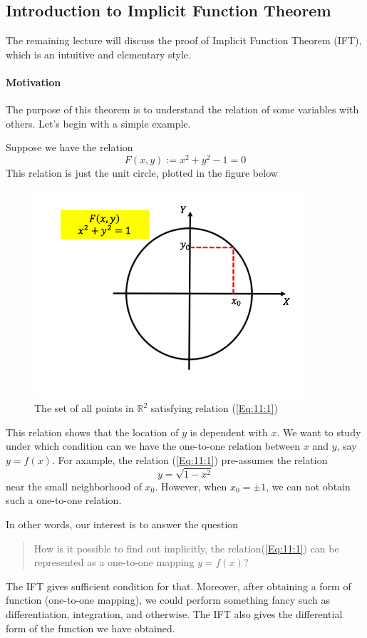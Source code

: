 \subsection{Introduction to Implicit Function Theorem}
The remaining lecture will discuss the proof of Implicit Function Theorem (IFT), which is an intuitive and elementary style.

\paragraph{Motivation}
The purpose of this theorem is to understand the relation of some variables with others. Let's begin with a simple example. 
\begin{example}
Suppose we have the relation
\begin{equation}\label{Eq:11:1}
F(x,y):=x^2+y^2-1=0
\end{equation}
This relation is just the unit circle, plotted in the figure below
\begin{figure}[H]
\centering
\includegraphics[width=10cm]{week11/F_11_1}
\caption{The set of all points in $\mathbb{R}^2$ satisfying relation (\ref{Eq:11:1})}
\end{figure}
This relation shows that the location of $y$ is dependent with $x$. We want to study under which condition can we have the one-to-one relation between $x$ and $y$, say $y=f(x)$. For axample, the relation (\ref{Eq:11:1}) pre-assumes the relation
\[
y=\sqrt{1-x^2}
\]
near the small neighborhood of $x_0$. However, when $x_0=\pm1$, we can not obtain such a one-to-one relation.
\end{example}
In other words, our interest is to answer the question
\begin{quotation}
How is it possible to find out implicitly, the relation(\ref{Eq:11:1}) can be represented as a one-to-one mapping $y=f(x)$?
\end{quotation}
The IFT gives sufficient condition for that. Moreover, after obtaining a form of function (one-to-one mapping), we could perform something fancy such as differentiation, integration, and otherwise. The IFT also gives the differential form of the function we have obtained.

